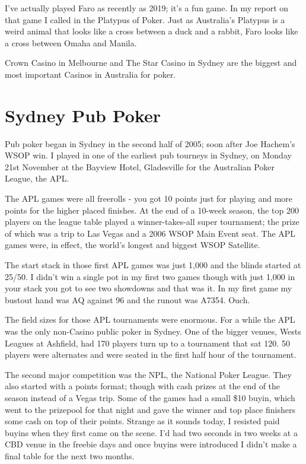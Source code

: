 I've actually played Faro as recently as 2019; it's a
fun game. In my report on that game I called in the Platypus of
Poker. Just as Australia's Platypus is a weird animal that looks like
a cross between a duck and a rabbit, Faro looks like a
cross between Omaha and Manila.

Crown Casino in Melbourne and The Star Casino in Sydney are the
biggest and most important Casinos in Australia for poker.

\section{Sydney Pub Poker}

Pub poker began in Sydney in the second half of 2005; soon after Joe
Hachem's WSOP win. I played in one of the earliest pub tourneys
in Sydney, on Monday 21st November at the Bayview Hotel, Gladesville
for the Australian Poker League, the APL.

The APL games were all freerolls - you got 10 points just for
playing and more points for the higher placed finishes. At the
end of a 10-week season, the top 200 players on the league table
played a winner-takes-all super tournament; the prize of which was a
trip to Las Vegas and a 2006 WSOP Main Event seat. The APL games were,
in effect, the world's longest and biggest WSOP Satellite.

The start stack in those first APL games was just 1,000 and the blinds
started at 25/50. I didn't win a single pot in my first two
games though with just 1,000 in your stack you got to see two
showdowns and that was it. In my first game my bustout hand was
AQ against 96 and the runout was A7354. Ouch.

The field sizes for those APL tournaments were enormous. For a while
the APL was the only non-Casino public poker in Sydney. One of the bigger
venues, Wests Leagues at Ashfield, had 170 players turn up to a
tournament that sat 120. 50 players were alternates and were seated in
the first half hour of the tournament.

The second major competition was the NPL, the National Poker
League. They also started with a points format; though with
cash prizes at the end of the season instead of a Vegas trip. Some of
the games had a small \$10 buyin, which went to the prizepool for that
night and gave the winner and top place finishers some cash on top of
their points. Strange as it sounds today, I resisted
paid buyins when they first came on the scene. I'd had two seconds in
two weeks at a CBD venue in the freebie days and once buyins were
introduced I didn't make a final table for the next two months.

